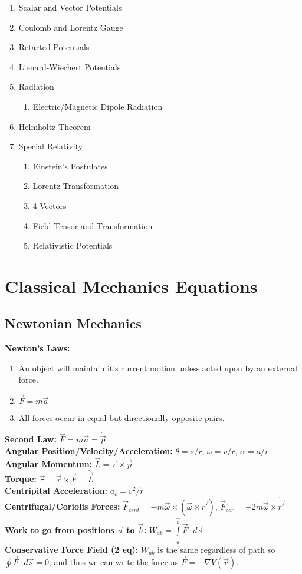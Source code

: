 \documentclass[12pt]{extarticle}
\begin{document}
\begin{enumerate}
  \item{Scalar and Vector Potentials}
  \item{Coulomb and Lorentz Gauge}
  \item{Retarted Potentials}
  \item{Lienard-Wiechert Potentials}
  \item{Radiation}
  \begin{enumerate}
    \item{Electric/Magnetic Dipole Radiation}
  \end{enumerate}
  \item{Helmholtz Theorem}
  \item{Special Relativity}
  \begin{enumerate}
    \item{Einstein's Postulates}
    \item{Lorentz Transformation}
    \item{4-Vectors}
    \item{Field Tensor and Transformation}
    \item{Relativistic Potentials}
  \end{enumerate}

\end{enumerate}

\section{Classical Mechanics Equations}
\subsection*{Newtonian Mechanics}
\textbf{Newton's Laws:}
\begin{enumerate}
  \item{An object will maintain it's current motion unless acted upon by an external force.}
  \item{$\vec{F} = m\vec{a}$}
  \item{All forces occur in equal but directionally opposite pairs.}
\end{enumerate}
\textbf{Second Law:} $\vec{F} = m\vec{a} = \dot{\vec{p}}$ \\
\textbf{Angular Position/Velocity/Acceleration:} $\theta = s/r$, $\omega = v/r$, $\alpha = a/r$ \\
\textbf{Angular Momentum:} $\vec{L} = \vec{r} \times \vec{p}$ \\
\textbf{Torque:} $\vec{\tau} = \vec{r} \times \vec{F} = \dot{\vec{L}}$ \\
\textbf{Centripital Acceleration: } $a_c = v^2/r$ \\
\textbf{Centrifugal/Coriolis Forces: } $\vec{F}_{cent} = -m\vec{\omega} \times (\vec{\omega} \times \vec{r'})$, $\vec{F}_{cor} = -2m\vec{\omega} \times \dot{\vec{r'}}$ \\
\textbf{Work to go from positions $\vec{a}$ to $\vec{b}$:} $W_{ab} = \int\limits_{\vec{a}}^{\vec{b}} \vec{F} \cdot d\vec{s}$ \\
\textbf{Conservative Force Field (2 eq):} $W_{ab}$ is the same regardless of path so $\oint \vec{F} \cdot d\vec{s} = 0$, and thus we can write the force as $\vec{F} = -\nabla V(\vec{r})$.
\end{document}
